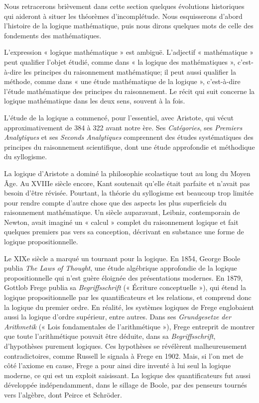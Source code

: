 \documentclass[../../../include/open-logic-section]{subfiles}
\begin{document}


Nous retracerons brièvement dans cette section quelques évolutions
historiques qui aideront à situer les théorèmes d'incomplétude. Nous
esquisserons d'abord l'histoire de la logique mathématique, puis nous
dirons quelques mots de celle des fondements des mathématiques.

\begin{digress}
  L'expression « logique mathématique » est ambiguë. L'adjectif
  « mathématique » peut qualifier l'objet étudié, comme dans « la
  logique des mathématiques », c'est-à-dire les principes du
  raisonnement mathématique; il peut aussi qualifier la méthode,
  comme dans « une étude mathématique de la logique », c'est-à-dire
  l'étude mathématique des principes du raisonnement. Le récit qui
  suit concerne la logique mathématique dans les deux sens, souvent
  à la fois.
\end{digress}

L'étude de la logique a commencé, pour l'essentiel, avec Aristote,
qui vécut approximativement de 384 à 322 avant notre ère. Ses
\emph{Catégories}, ses \emph{Premiers Analytiques} et ses
\emph{Seconds Analytiques} comprennent des études systématiques des
principes du raisonnement scientifique, dont une étude approfondie
et méthodique du syllogisme.

La logique d'Aristote a dominé la philosophie scolastique tout au
long du Moyen Âge. Au XVIIIe siècle encore, Kant soutenait qu'elle
était parfaite et n'avait pas besoin d'être révisée. Pourtant, la
théorie du syllogisme est beaucoup trop limitée pour rendre compte
d'autre chose que des aspects les plus superficiels du raisonnement
mathématique. Un siècle auparavant, Leibniz, contemporain de Newton,
avait imaginé un « calcul » complet du raisonnement logique et fait
quelques premiers pas vers sa conception, décrivant en substance une
forme de logique propositionnelle.

Le XIXe siècle a marqué un tournant pour la logique. En 1854, George
Boole publia \emph{The Laws of Thought}, une étude algébrique
approfondie de la logique propositionnelle qui n'est guère éloignée
des présentations modernes. En 1879, Gottlob Frege publia sa
\emph{Begriffsschrift} (« Écriture conceptuelle »), qui étend la
logique propositionnelle par les quantificateurs et les relations,
et comprend donc la logique du premier ordre. En réalité, les
systèmes logiques de Frege englobaient aussi la logique d'ordre
supérieur, entre autres. Dans ses \emph{Grundgesetze der Arithmetik}
(« Lois fondamentales de l'arithmétique »), Frege entreprit de
montrer que toute l'arithmétique pouvait être déduite, dans sa
\emph{Begriffsschrift}, d'hypothèses purement logiques. Ces
hypothèses se révélèrent malheureusement contradictoires, comme
Russell le signala à Frege en 1902. Mais, si l'on met de côté l'axiome en
cause, Frege a pour ainsi dire inventé à lui seul la logique
moderne, ce qui est un exploit saisissant. La logique des
quantificateurs fut aussi développée indépendamment, dans le
sillage de Boole, par des penseurs tournés vers l'algèbre, dont
Peirce et Schr\"oder.
\end{document}
